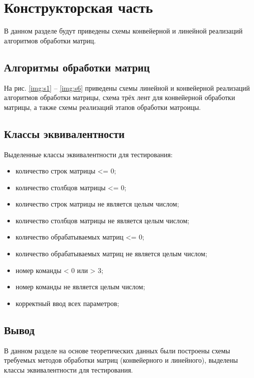 \chapter{Конструкторская часть}
 В данном разделе будут приведены схемы конвейерной и линейной реализаций алгоритмов обработки матриц.

\section{Алгоритмы обработки матриц}

На рис. \ref{img:s1} -- \ref{img:s6} приведены схемы линейной и конвейерной реализаций алгоритмов обработки матрицы, схема трёх лент для конвейерной обработки матрицы, а также схемы реализаций этапов обработки матроицы.

\newpage
{}

\newpage
{}

\newpage
{}

\newpage
{}

\newpage
{}

\newpage
{}

\section{Классы эквивалентности}

Выделенные классы эквивалентности для тестирования:

\begin{itemize}[label=---]
	\item количество строк матрицы <= 0;
	\item количество столбцов матрицы <= 0;
	\item количество строк матрицы не является целым числом;
	\item количество столбцов матрицы не является целым числом;
	\item количество обрабатываемых матриц <= 0;
	\item количество обрабатываемых матриц не является целым числом;
	\item номер команды < 0 или > 3;
	\item номер команды не является целым числом;
	\item корректный ввод всех параметров;
\end{itemize}


\section*{Вывод}

В данном разделе на основе теоретических данных были построены схемы требуемых методов обработки матриц (конвейерного и линейного), выделены классы эквивалентности для тестирования.
